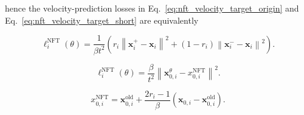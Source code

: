 \documentclass{article} %
\begin{document}
hence the velocity-prediction losses in Eq.~\ref{eq:nft_velocity_target_origin} and
Eq.~\ref{eq:nft_velocity_target_short} are equivalently


\begin{equation}
\ell_i^{\mathrm{NFT}}(\theta)
=
\frac{1}{\beta t^2}(r_i
\left\|
\mathbf{x}_{i}^{+}
-
\mathbf{x}_i
\right\|^2
+
(1-r_i)
\left\|
\mathbf{x}_{i}^{-}
-
\mathbf{x}_i
\right\|^2) .
\end{equation}


\begin{equation}
\ell_i^{\mathrm{NFT}}(\theta)
=
\frac{\beta}{t^2}
\left\|
\mathbf{x}_{0,i}^{\theta}
-
x_{0,i}^{\mathrm{NFT}}
\right\|^2.
\end{equation}

\begin{equation}
x_{0,i}^{\mathrm{NFT}}
=
\mathbf{x}_{0,i}^{\mathrm{old}}
+
\frac{2r_i-1}{\beta}
\left(
\mathbf{x}_{0,i}-\mathbf{x}_{0,i}^{\mathrm{old}}
\right).
\end{equation}
\end{document}
